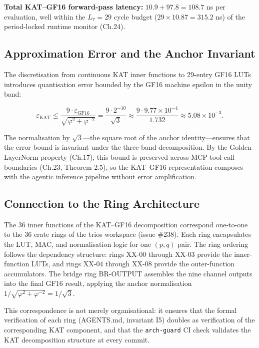\textbf{Total KAT--GF16 forward-pass latency:}
\(10.9 + 97.8 = 108.7\) ns per evaluation, well
within the \(L_7 = 29\) cycle budget
(\(29 \times 10.87 = 315.2\) ns) of the
period-locked runtime monitor (Ch.24).

\subsection{Approximation Error and the Anchor
Invariant}\label{fa_23:kat-approximation-error}

The discretisation from continuous KAT inner
functions to 29-entry GF16 LUTs introduces
quantisation error bounded by the GF16 machine
epsilon in the unity band:

\[
\varepsilon_{\mathrm{KAT}} \leq \frac{9 \cdot \varepsilon_{\mathrm{GF16}}}{\sqrt{\varphi^2 + \varphi^{-2}}} = \frac{9 \cdot 2^{-10}}{\sqrt{3}} \approx \frac{9 \cdot 9.77 \times 10^{-4}}{1.732} \approx 5.08 \times 10^{-3}.
\]

The normalisation by \(\sqrt{3}\)---the square root
of the anchor identity---ensures that the error
bound is invariant under the three-band
decomposition. By the Golden LayerNorm property
(Ch.17), this bound is preserved across MCP
tool-call boundaries (Ch.23, Theorem 2.5), so the
KAT--GF16 representation composes with the agentic
inference pipeline without error amplification.

\subsection{Connection to the Ring
Architecture}\label{fa_23:kat-ring-connection}

The 36 inner functions of the KAT--GF16
decomposition correspond one-to-one to the 36 crate
rings of the trios workspace (issue \#238). Each
ring encapsulates the LUT, MAC, and normalisation
logic for one \((p, q)\) pair. The ring ordering
follows the dependency structure: rings
\(\mathrm{XX}\text{-}00\) through \(\mathrm{XX}\text{-}03\)
provide the inner-function LUTs, and rings
\(\mathrm{XX}\text{-}04\) through
\(\mathrm{XX}\text{-}08\) provide the outer-function
accumulators. The bridge ring
\(\mathrm{BR}\text{-}\mathrm{OUTPUT}\) assembles
the nine channel outputs into the final GF16 result,
applying the anchor normalisation
\(1/\sqrt{\varphi^2 + \varphi^{-2}} = 1/\sqrt{3}\).

This correspondence is not merely organisational:
it ensures that the formal verification of each ring
(AGENTS.md, invariant I5) doubles as verification
of the corresponding KAT component, and that the
\texttt{arch-guard} CI check validates the KAT
decomposition structure at every commit.

